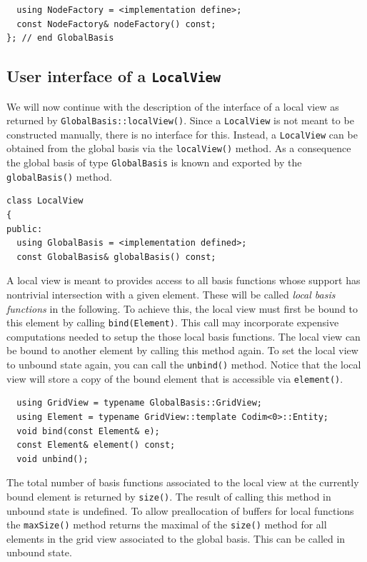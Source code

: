 \documentclass[a4paper,10pt,headings=normal,bibliography=totoc]{scrartcl}
\begin{document}
\begin{lstlisting}
  using NodeFactory = <implementation define>;
  const NodeFactory& nodeFactory() const;
}; // end GlobalBasis
\end{lstlisting}



\subsection{User interface of a \texttt{LocalView}}
We will now continue with the description of the interface
of a local view as returned by \texttt{GlobalBasis::localView()}.
Since a \texttt{LocalView} is not meant to be constructed
manually, there is no interface for this. Instead, a \texttt{LocalView}
can be obtained from the global basis via the \texttt{localView()}
method. As a consequence the global basis of type \texttt{GlobalBasis}
is known and exported by the \texttt{globalBasis()} method.

\begin{lstlisting}
class LocalView
{
public:
  using GlobalBasis = <implementation defined>;
  const GlobalBasis& globalBasis() const;
\end{lstlisting}

A local view is meant to provides access to all basis
functions whose support has nontrivial intersection with
a given element. These will be called \emph{local basis functions}
in the following. To achieve this, the local view must
first be bound to this element by calling \texttt{bind(Element)}.
This call may incorporate expensive computations needed to
setup the those local basis functions. The local view can be
bound to another element by calling this method again.
To set the local view to unbound state again, you
can call the \texttt{unbind()} method.
Notice that the local view will store a copy of the bound
element that is accessible via \texttt{element()}.

\begin{lstlisting}
  using GridView = typename GlobalBasis::GridView;
  using Element = typename GridView::template Codim<0>::Entity;
  void bind(const Element& e);
  const Element& element() const;
  void unbind();
\end{lstlisting}

The total number of basis functions associated to the
local view at the currently bound element is returned
by \texttt{size()}. The result of calling this method in
unbound state is undefined.
To allow preallocation of buffers for local functions
the \texttt{maxSize()} method returns the maximal of the
\texttt{size()} method for all elements in the grid view
associated to the global basis. This can be called in
unbound state.
\end{document}
